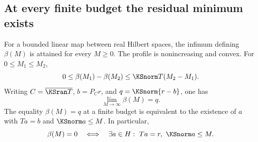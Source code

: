 \subsection{At every finite budget the residual minimum exists}
\begin{KStheorem}\label{KS:WR03}
For a bounded linear map between real Hilbert spaces, the infimum defining $\beta(M)$ is attained for every $M\ge0$. The profile is nonincreasing and convex. For $0\le M_1\le M_2$,
\[
 0\le\beta(M_1)-\beta(M_2)\le\KSnorm T(M_2-M_1).
\]
Writing $C=\overline{\KSran T}$, $b=P_Cr$, and $q=\KSnorm{r-b}$, one has
\[
 \lim_{M\to\infty}\beta(M)=q.
\]
The equality $\beta(M)=q$ at a finite budget is equivalent to the existence of $a$ with $Ta=b$ and $\KSnorm a\le M$. In particular,
\[
 \beta(M)=0\quad\Longleftrightarrow\quad
 \exists a\in H:\ Ta=r,\ \KSnorm a\le M.
\]
\end{KStheorem}
